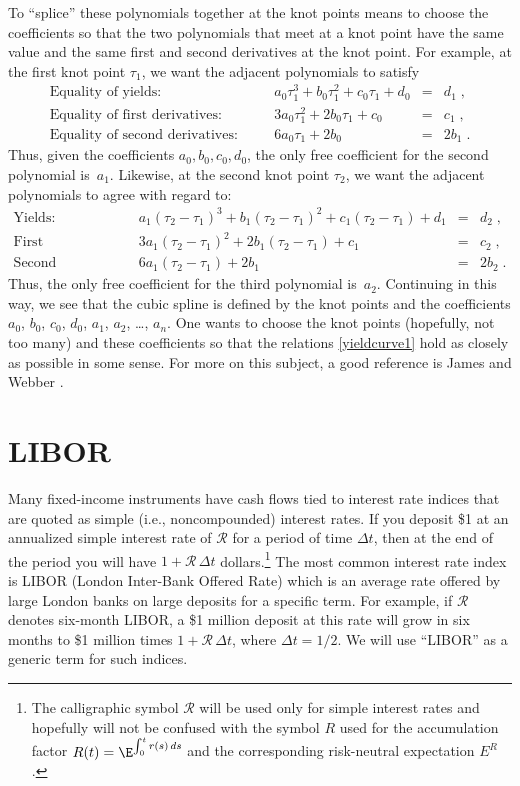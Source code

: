 To ``splice'' these polynomials together at the knot points means to choose the coefficients so that the two polynomials that meet at a knot point have the same value and the same first and second derivatives at the knot point.  For example, at the first knot point $\tau_1$, we want the adjacent polynomials to satisfy
$$
\begin{array}{llrcl}
\text{Equality of yields:} &\quad &a_0 \tau_1^3 + b_0 \tau_1^2 + c_0 \tau_1 + d_0 &= &d_1\; ,\\
\text{Equality of first derivatives:} & \quad &3a_0 \tau_1^2 + 2b_0 \tau_1 + c_0  &= &c_1\; ,\\
\text{Equality of second derivatives:} & \quad &6a_0 \tau_1 + 2b_0  &= &2b_1\;.
\end{array}$$
Thus, given the coefficients $a_0, b_0, c_0, d_0$, the only free coefficient for the second polynomial is~$a_1$.  Likewise, at the second knot point $\tau_2$, we want the adjacent polynomials to agree with regard to:
$$
\begin{array}{llrcl}
\text{Yields:} &\quad &a_1 (\tau_2-\tau_1)^3 + b_1(\tau_2- \tau_1)^2 + c_1 (\tau_2-\tau_1) + d_1 &= &d_2\; ,\\
\text{First derivatives:} & \quad &3a_1 (\tau_2-\tau_1)^2 + 2b_1(\tau_2- \tau_1) + c_1  &= &c_2\; ,\\
\text{Second derivatives:} & \quad &6a_1 (\tau_2-\tau_1) + 2b_1  &= &2b_2\;.
\end{array}$$
Thus, the only free coefficient for the third polynomial is~$a_2$.
Continuing in this way, we see that the cubic spline is defined by the knot points and the coefficients $a_0$, $b_0$, $c_0$, $d_0$, $a_1$, $a_2$, \ldots, $a_n$.  One wants to choose the knot points (hopefully, not too many) and these coefficients so that the relations \eqref{yieldcurve1} hold as closely as possible in some sense.  For more on this subject, a good reference is James and Webber \cite{JW}.

\section{LIBOR}

Many fixed-income instruments have cash flows tied to interest rate indices that are quoted as simple (i.e., noncompounded) interest rates.   If you deposit \$1 at an annualized simple interest rate of $\mathcal{R}$ for a period of time $\varDelta t$, then at the end of the period you will have $1+\mathcal{R}\,\varDelta t$ dollars.\footnote{The calligraphic symbol $\mathcal{R}$ will be used only for simple interest rates and hopefully will not be confused with the symbol $R$ used for the accumulation factor $R(t)=\E^{\int_0^t r(s)\,ds}$ and the corresponding risk-neutral expectation $E^R$.}  The most common interest rate index is LIBOR (London Inter-Bank Offered Rate)  which is an average rate offered by large London banks on large  deposits for a specific term.  For example, if $\mathcal{R}$ denotes six-month LIBOR, a \$1 million deposit at this rate will grow in six months to \$1 million times $1+\mathcal{R}\,\varDelta t$, where $\varDelta t=1/2$.  We will use ``LIBOR'' as a generic term for such indices.  


